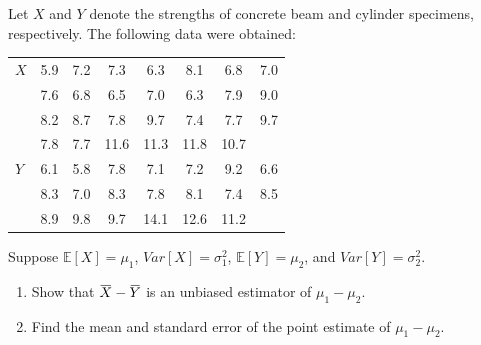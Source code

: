 \begin{example}
    Let $X$ and $Y$ denote the strengths of concrete beam and cylinder specimens, respectively.
    The following data were obtained:

    \begin{table}[h!]
    \centering
    \small
    \begin{tabular}{l|ccccccc}
    \hline
    $X$ & 5.9 & 7.2 & 7.3 & 6.3 & 8.1 & 6.8 & 7.0 \\
        & 7.6 & 6.8 & 6.5 & 7.0 & 6.3 & 7.9 & 9.0 \\
        & 8.2 & 8.7 & 7.8 & 9.7 & 7.4 & 7.7 & 9.7 \\
        & 7.8 & 7.7 & 11.6 & 11.3 & 11.8 & 10.7 & \\
    \hline
    $Y$ & 6.1 & 5.8 & 7.8 & 7.1 & 7.2 & 9.2 & 6.6 \\
        & 8.3 & 7.0 & 8.3 & 7.8 & 8.1 & 7.4 & 8.5 \\
        & 8.9 & 9.8 & 9.7 & 14.1 & 12.6 & 11.2 & \\
    \hline
    \end{tabular}
    \end{table}
    Suppose $\mathbb{E}[X] = \mu_1$, $Var[X] = \sigma^2_1$, $\mathbb{E}[Y] = \mu_2$, and $Var[Y] = \sigma^2_2$.
    \begin{enumerate}
        \item Show that $\ols{X} - \ols{Y}$ is an unbiased estimator of $\mu_1 - \mu_2$.
        \item Find the mean and standard error of the point estimate of $\mu_1 - \mu_2$.
    \end{enumerate}
\end{example}

